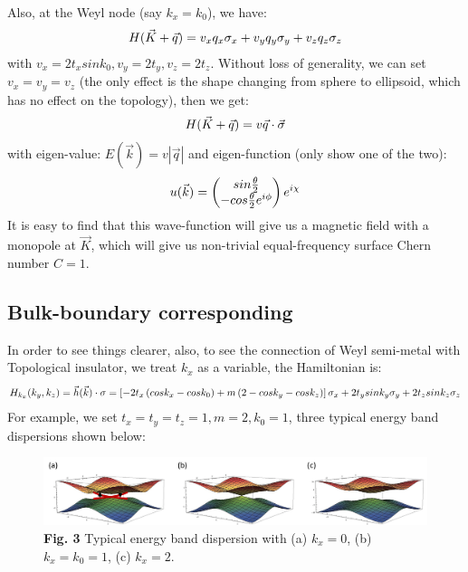 \documentclass[letterpaper,10pt,english]{sphinxmanual}
\begin{document}
Also, at the Weyl node (say \(k_x=k_0\)), we have:
\begin{gather}
\begin{split}H(\vec{K}+\vec{q})=v_xq_x\sigma_x+v_yq_y\sigma_y+v_zq_z\sigma_z\end{split}\notag
\end{gather}
with \(v_x=2t_xsink_0,v_y=2t_y,v_z=2t_z\). Without loss of generality, we can set \(v_x=v_y=v_z\) (the only effect is the shape changing from sphere to ellipsoid, which has no effect on the topology), then we get:
\begin{gather}
\begin{split}H(\vec{K}+\vec{q})=v\vec{q}\cdot\vec{\sigma}\end{split}\notag
\end{gather}
with eigen-value: \(E(\vec{k})=v|\vec{q}|\) and eigen-function (only show one of the two):
\begin{gather}
\begin{split}u(\vec{k})=\begin{pmatrix}sin\frac{\theta}{2}\\-cos\frac{\theta}{2}e^{i\phi}\end{pmatrix}e^{i\chi}\end{split}\notag
\end{gather}
It is easy to find that this wave-function will give us a magnetic field with a monopole at \(\vec{K}\), which will give us non-trivial equal-frequency surface Chern number \(C=1\).


\subsection{Bulk-boundary corresponding}
\label{TI/Weyl_semi-metal:bulk-boundary-corresponding}
In order to see things clearer, also, to see the connection of Weyl semi-metal with Topological insulator, we treat \(k_x\) as a variable, the Hamiltonian is:
\begin{gather}
\begin{split}H_{k_x}(k_y,k_z)=\vec{h}(\vec{k})\cdot\sigma=\left[-2t_x\left(cosk_x-cosk_0\right)+m\left(2-cosk_y-cosk_z\right)\right]\sigma_x+2t_ysink_y\sigma_y+2t_zsink_z\sigma_z\end{split}\notag
\end{gather}
For example, we set \(t_x=t_y=t_z=1,m=2,k_0=1\), three typical energy band dispersions shown below:
\begin{figure}[htbp]
\centering
\capstart

\includegraphics[width=0.800\linewidth]{3.png}
\caption{\textbf{Fig. 3} Typical energy band dispersion with (a) \(k_x=0\), (b) \(k_x=k_0=1\), (c) \(k_x=2\).}\end{figure}
\end{document}
